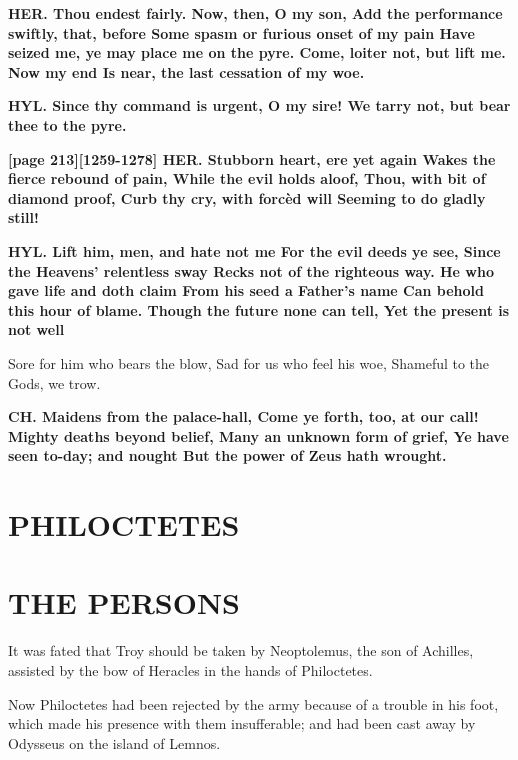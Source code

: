 \documentclass[11pt,letter]{book}
\begin{document}
\par \textbf{HER. Thou endest fairly. Now, then, O my son, Add the performance swiftly, that, before Some spasm or furious onset of my pain Have seized me, ye may place me on the pyre. Come, loiter not, but lift me. Now my end Is near, the last cessation of my woe.}
\par 

\par \textbf{HYL. Since thy command is urgent, O my sire! We tarry not, but bear thee to the pyre.}
\par 

\par \textbf{[page 213][1259-1278] HER. Stubborn heart, ere yet again Wakes the fierce rebound of pain, While the evil holds aloof, Thou, with bit of diamond proof, Curb thy cry, with forcèd will Seeming to do gladly still!}
\par 

\par \textbf{HYL. Lift him, men, and hate not me For the evil deeds ye see, Since the Heavens’ relentless sway Recks not of the righteous way. He who gave life and doth claim From his seed a Father’s name Can behold this hour of blame. Though the future none can tell, Yet the present is not well}
\par   Sore for him who bears the blow, Sad for us who feel his woe, Shameful to the Gods, we trow.

\par \textbf{CH. Maidens from the palace-hall, Come ye forth, too, at our call! Mighty deaths beyond belief, Many an unknown form of grief, Ye have seen to-day; and nought But the power of Zeus hath wrought.}
\par 
\section{PHILOCTETES}\section{THE PERSONS} 
\par  [page 216] It was fated that Troy should be taken by Neoptolemus, the son of Achilles, assisted by the bow of Heracles in the hands of Philoctetes.

\par  Now Philoctetes had been rejected by the army because of a trouble in his foot, which made his presence with them insufferable; and had been cast away by Odysseus on the island of Lemnos.
\end{document}
